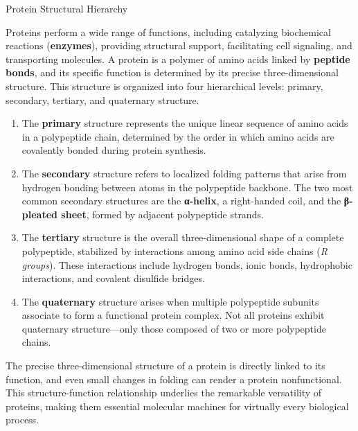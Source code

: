 \documentclass[10pt]{article}
\begin{document}
    \begin{core}{Protein Structural Hierarchy}

      Proteins perform a wide range of functions, including catalyzing biochemical reactions (\textbf{enzymes}), providing structural support, facilitating cell signaling, and transporting molecules. A protein is a polymer of amino acids linked by \textbf{peptide bonds}, and its specific function is determined by its precise three-dimensional structure. This structure is organized into four hierarchical levels: primary, secondary, tertiary, and quaternary structure.


      \begin{enumerate}

        \item The \textbf{primary} structure represents the unique linear sequence of amino acids in a polypeptide chain, determined by the order in which amino acids are covalently bonded during protein synthesis.

        \item The \textbf{secondary} structure refers to localized folding patterns that arise from hydrogen bonding between atoms in the polypeptide backbone. The two most common secondary structures are the \textbf{α-helix}, a right-handed coil, and the \textbf{β-pleated sheet}, formed by adjacent polypeptide strands.

        \item The \textbf{tertiary} structure is the overall three-dimensional shape of a complete polypeptide, stabilized by interactions among amino acid side chains (\textit{R groups}). These interactions include hydrogen bonds, ionic bonds, hydrophobic interactions, and covalent disulfide bridges.

        \item The \textbf{quaternary} structure arises when multiple polypeptide subunits associate to form a functional protein complex. Not all proteins exhibit quaternary structure---only those composed of two or more polypeptide chains.

      \end{enumerate}

      The precise three-dimensional structure of a protein is directly linked to its function, and even small changes in folding can render a protein nonfunctional. This structure-function relationship underlies the remarkable versatility of proteins, making them essential molecular machines for virtually every biological process.

    \end{core}
\end{document}

